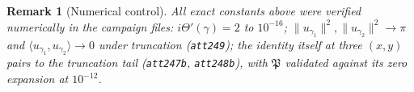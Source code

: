 \documentclass[11pt]{article}
\newtheorem{remark}[theorem]{Remark}
\newcommand{\Th}{\Theta}
\newcommand{\Pfr}{\mathfrak{P}}
\begin{document}
\begin{remark}[Numerical control]
All exact constants above were verified numerically in the campaign files:
$i\Th'(\gamma)=2$ to $10^{-16}$; $\|u_{\gamma_1}\|^2,\|u_{\gamma_2}\|^2\to\pi$
and $\langle u_{\gamma_1},u_{\gamma_2}\rangle\to0$ under truncation
(\texttt{att249}); the identity itself at three $(x,y)$ pairs to the
truncation tail (\texttt{att247b}, \texttt{att248b}), with $\Pfr$ validated
against its zero expansion at $10^{-12}$.
\end{remark}
\end{document}
